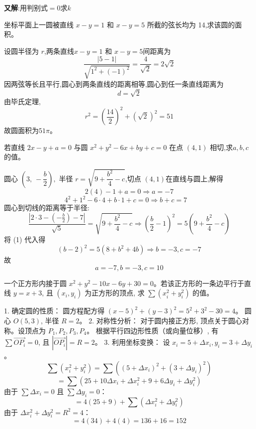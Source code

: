 \begin{questions}
\begin{solution}
        \textbf{又解}:用判别式$=0$求$k$
    \end{solution}

    \question 坐标平面上一圆被直线 \(x - y = 1\) 和 \(x - y = 5\) 所截的弦长均为 14,求该圆的面积。 
        \begin{solution}
        设圆半径为 \(r\),两条直线\(x - y = 1\) 和 \(x - y = 5\)间距离为
        \[
        \frac{|5 - 1|}{\sqrt{1^2 + (-1)^2}} = \frac{4}{\sqrt{2}} = 2\sqrt{2}
        \]
        因两弦等长且平行,圆心到两条直线的距离相等,圆心到任一条直线距离为
        \[
        d =\sqrt{2}
        \]
        由毕氏定理,
        \[
        r^2=\left(\frac{14}{2}\right)^2 + (\sqrt2)^2= 51
        \]
        故圆面积为$51\pi$。
    \end{solution}

    \question 若直线 \(2x - y + a = 0\) 与圆 \(x^2 + y^2 - 6x + by + c = 0\) 在点 \((4,1)\) 相切,求$a,b,c$的值。  
    \begin{solution}
        圆心 $\left(3,\ -\dfrac{b}{2}\right),$ 半径 $r = \sqrt{9 + \dfrac{b^2}{4} - c}$,切点 \((4,1)\)在直线与圆上,解得
        \[
        2(4) - 1 + a = 0 \Rightarrow a=-7
        \]
        \[
        4^2 + 1^2 - 6 \cdot 4 + b \cdot 1 + c = 0  \Rightarrow b + c = 7 \quad \tag{1}
        \]
        圆心到切线的距离等于半径:
        \[
        \frac{|2 \cdot 3 - (-\frac{b}{2}) - 7|}{\sqrt{5}}  = \sqrt{9 + \frac{b^2}{4} - c}
        \Rightarrow
        \left( \frac{b}{2} - 1 \right)^2 = 5\left(9 + \frac{b^2}{4} - c\right)
        \]
        将 (1) 代入得    
        \[
        (b-2)^2=5(8+b^2+4b)
        \Rightarrow b = -3, c=-7
        \]
        故
        \[
        a=-7,b=-3,c=10
        \]
    \end{solution}

    \question
一个正方形内接于圆 $x^2 + y^2 - 10x - 6y + 30 = 0$。若该正方形的一条边平行于直线 $y = x + 3$, 且 $(x_i, y_i)$ 为正方形的顶点, 求 $\sum (x_i^2 + y_i^2)$ 的值。

\begin{solution}
1. 确定圆的性质：
   圆方程配方得 $(x - 5)^2 + (y - 3)^2 = 5^2 + 3^2 - 30 = 4$。
   圆心 $O(5, 3)$, 半径 $R = 2$。
2. 对称性分析：
   对于圆内接正方形, 顶点关于圆心对称。设顶点为 $P_1, P_2, P_3, P_4$。
   根据平行四边形性质（或向量位移）, 有 $\sum \vec{OP_i} = 0$, 且 $|\vec{OP_i}| = R = 2$。
3. 利用坐标变换：
   设 $x_i = 5 + \Delta x_i, y_i = 3 + \Delta y_i$。
   \[ \sum (x_i^2 + y_i^2) = \sum ((5 + \Delta x_i)^2 + (3 + \Delta y_i)^2) \]
   \[ = \sum (25 + 10\Delta x_i + \Delta x_i^2 + 9 + 6\Delta y_i + \Delta y_i^2) \]
   由于 $\sum \Delta x_i = 0$ 且 $\sum \Delta y_i = 0$：
   \[ = 4(25 + 9) + \sum (\Delta x_i^2 + \Delta y_i^2) \]
   由于 $\Delta x_i^2 + \Delta y_i^2 = R^2 = 4$：
   \[ = 4(34) + 4(4) = 136 + 16 = 152 \]
\end{solution}


\end{questions}
